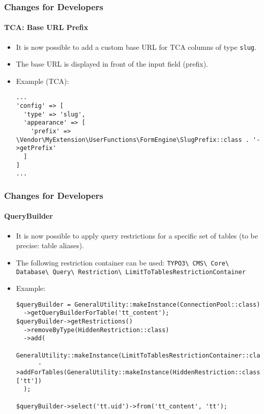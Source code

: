 \begin{frame}[fragile]
	\frametitle{Changes for Developers}
	\framesubtitle{TCA: Base URL Prefix}

	\lstset{basicstyle=\tiny\ttfamily}

	\begin{itemize}

		\item It is now possible to add a custom base URL for TCA columns of type \texttt{slug}.
		\item The base URL is displayed in front of the input field (prefix).
		\item Example (TCA):

\vspace{-0.4cm}
\begin{lstlisting}
...
'config' => [
  'type' => 'slug',
  'appearance' => [
    'prefix' => \Vendor\MyExtension\UserFunctions\FormEngine\SlugPrefix::class . '->getPrefix'
  ]
]
...
\end{lstlisting}

	\end{itemize}

\end{frame}


\begin{frame}[fragile]
	\frametitle{Changes for Developers}
	\framesubtitle{QueryBuilder}

	\lstset{basicstyle=\tiny\ttfamily}

	\begin{itemize}
		\item It is now possible to apply query restrictions
			for a specific set of tables (to be precise: table aliases).
		\item The following restriction container can be used:\newline
			\begingroup
				\fontsize{7}{9}
					\texttt{TYPO3\textbackslash
						CMS\textbackslash
						Core\textbackslash
						Database\textbackslash
						Query\textbackslash
						Restriction\textbackslash
						LimitToTablesRestrictionContainer}
			\endgroup

		\item Example:
\begin{lstlisting}
$queryBuilder = GeneralUtility::makeInstance(ConnectionPool::class)
  ->getQueryBuilderForTable('tt_content');
$queryBuilder->getRestrictions()
  ->removeByType(HiddenRestriction::class)
  ->add(
    GeneralUtility::makeInstance(LimitToTablesRestrictionContainer::class)
      ->addForTables(GeneralUtility::makeInstance(HiddenRestriction::class), ['tt'])
  );

$queryBuilder->select('tt.uid')->from('tt_content', 'tt');
\end{lstlisting}

	\end{itemize}

\end{frame}

